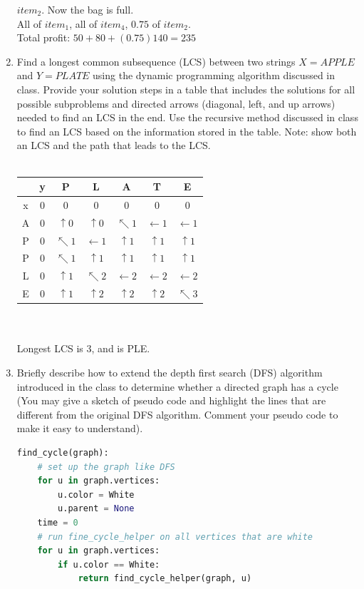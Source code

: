\documentclass{article}
\begin{document}
\begin{enumerate}
            $item_2$. Now the bag is full.\\
            All of $item_1$, all of $item_4$, $0.75$ of $item_2$.\\
            Total profit: $50 + 80 + (0.75)140 = 235$
        \item Find a longest common subsequence (LCS) between two strings 
        $X = APPLE$ and $Y = PLATE$ using the dynamic programming algorithm 
        discussed in class. Provide your solution steps in a table that 
        includes the solutions for all possible subproblems and directed 
        arrows (diagonal, left, and up arrows) needed to find an LCS in the 
        end. Use the recursive method discussed in class to find an LCS based 
        on the information stored in the table. Note: show both an LCS and the 
        path that leads to the LCS.\\\\
            \begin{tabular}{| c | c | c | c | c | c | c |}
                \hline
                 & y & P & L & A & T & E\\
                \hline
                x & 0 & 0 & 0 & 0 & 0 & 0\\
                \hline
                A & 0 & $\uparrow 0$ & $\uparrow 0$ & $\nwarrow 1$ & $\leftarrow 1$ & $\leftarrow 1$ \\
                \hline
                P & \cellcolor{green!25}0 & $\nwarrow 1$ & $\leftarrow 1$ & $\uparrow 1$ & $\uparrow 1$ & $\uparrow 1$ \\
                \hline
                P & 0 & \cellcolor{green!50}$\nwarrow 1$ & $\uparrow 1$ & $\uparrow 1$ & $\uparrow 1$ & $\uparrow 1$ \\
                \hline
                L & 0 & $\uparrow 1$ & \cellcolor{green!50}$\nwarrow 2$ & \cellcolor{green!25}$\leftarrow 2$ & \cellcolor{green!25}$\leftarrow 2$ & $\leftarrow 2$ \\
                \hline
                E & 0 & $\uparrow 1$ & $\uparrow 2$ & $\uparrow 2$ & $\uparrow 2$ & \cellcolor{green!50} $\nwarrow 3$\\
                \hline
            \end{tabular}\\\\
            Longest LCS is 3, and is PLE.
        \item Briefly describe how to extend the depth first search (DFS) 
        algorithm introduced in the class to determine whether a directed 
        graph has a cycle (You may give a sketch of pseudo code and highlight 
        the lines that are different from the original DFS algorithm. Comment 
        your pseudo code to make it easy to understand).
            \begin{lstlisting}[language=python]
find_cycle(graph):
    # set up the graph like DFS
    for u in graph.vertices:
        u.color = White
        u.parent = None
    time = 0
    # run fine_cycle_helper on all vertices that are white
    for u in graph.vertices:
        if u.color == White:
            return find_cycle_helper(graph, u)


\end{lstlisting}
\end{enumerate}
\end{document}
